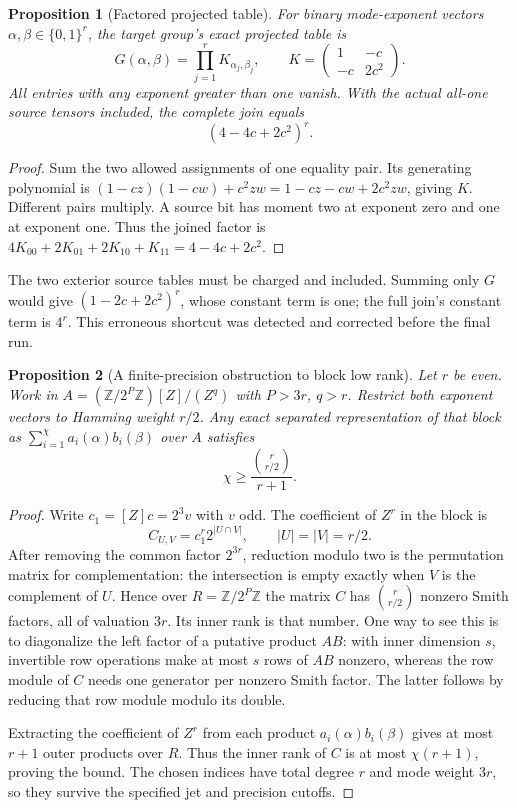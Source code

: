 \documentclass[11pt]{article}
\newtheorem{proposition}{Proposition}
\begin{document}
\begin{proposition}[Factored projected table]
For binary mode-exponent vectors $\alpha,\beta\in\{0,1\}^r$, the
target group's exact projected table is
\[
 G(\alpha,\beta)=\prod_{j=1}^{r}K_{\alpha_j,\beta_j},\qquad
 K=\begin{pmatrix}1&-c\\-c&2c^2\end{pmatrix}.
\]
All entries with any exponent greater than one vanish. With the actual
all-one source tensors included, the complete join equals
\[
 (4-4c+2c^2)^r.
\]
\end{proposition}
\begin{proof}
Sum the two allowed assignments of one equality pair. Its generating
polynomial is
$(1-cz)(1-cw)+c^2zw=1-cz-cw+2c^2zw$, giving $K$.
Different pairs multiply. A source bit has moment two at exponent zero
and one at exponent one. Thus the joined factor is
$4K_{00}+2K_{01}+2K_{10}+K_{11}=4-4c+2c^2$.
\end{proof}

The two exterior source tables must be charged and included. Summing
only $G$ would give $(1-2c+2c^2)^r$, whose constant term is one;
the full join's constant term is $4^r$. This erroneous shortcut was
detected and corrected before the final run.

\begin{proposition}[A finite-precision obstruction to block low rank]
Let $r$ be even. Work in
$A=(\mathbb Z/2^P\mathbb Z)[Z]/(Z^q)$ with $P>3r$, $q>r$.
Restrict both exponent vectors to Hamming weight $r/2$.
Any exact separated representation of that block as
$\sum_{i=1}^{\chi} a_i(\alpha)b_i(\beta)$ over $A$ satisfies
\[
 \chi\ge\frac{\binom r{r/2}}{r+1}.
\]
\end{proposition}
\begin{proof}
Write $c_1=[Z]c=2^3v$ with $v$ odd. The coefficient of $Z^r$ in
the block is
\[
 C_{U,V}=c_1^r2^{|U\cap V|},\qquad |U|=|V|=r/2.
\]
After removing the common factor $2^{3r}$, reduction modulo two is
the permutation matrix for complementation: the intersection is empty
exactly when $V$ is the complement of $U$. Hence over
$R=\mathbb Z/2^P\mathbb Z$ the matrix $C$ has
$\binom r{r/2}$ nonzero Smith factors, all of valuation $3r$.
Its inner rank is that number. One way to see this is to diagonalize
the left factor of a putative product $AB$: with inner dimension $s$,
invertible row operations make at most $s$ rows of $AB$ nonzero, whereas
the row module of $C$ needs one generator per nonzero Smith factor.
The latter follows by reducing that row module modulo its double.

Extracting the coefficient of $Z^r$ from each product
$a_i(\alpha)b_i(\beta)$ gives at most $r+1$ outer products over $R$.
Thus the inner rank of $C$ is at most $\chi(r+1)$, proving the bound.
The chosen indices have total degree $r$ and mode weight $3r$, so they
survive the specified jet and precision cutoffs.
\end{proof}
\end{document}
